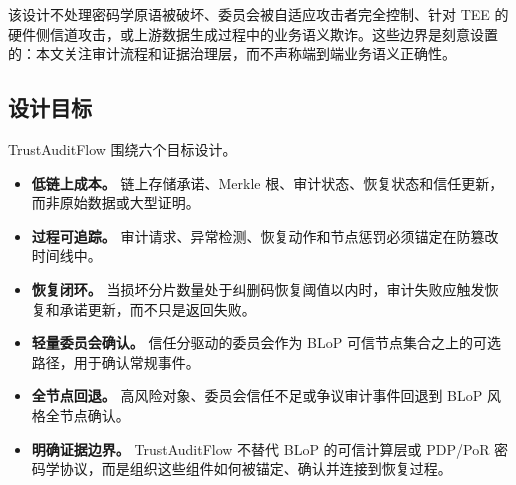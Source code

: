 该设计不处理密码学原语被破坏、委员会被自适应攻击者完全控制、针对 TEE 的硬件侧信道攻击，或上游数据生成过程中的业务语义欺诈。这些边界是刻意设置的：本文关注审计流程和证据治理层，而不声称端到端业务语义正确性。

\subsection{设计目标}

TrustAuditFlow 围绕六个目标设计。

\begin{itemize}
  \item \textbf{低链上成本。} 链上存储承诺、Merkle 根、审计状态、恢复状态和信任更新，而非原始数据或大型证明。
  \item \textbf{过程可追踪。} 审计请求、异常检测、恢复动作和节点惩罚必须锚定在防篡改时间线中。
  \item \textbf{恢复闭环。} 当损坏分片数量处于纠删码恢复阈值以内时，审计失败应触发恢复和承诺更新，而不只是返回失败。
  \item \textbf{轻量委员会确认。} 信任分驱动的委员会作为 BLoP 可信节点集合之上的可选路径，用于确认常规事件。
  \item \textbf{全节点回退。} 高风险对象、委员会信任不足或争议审计事件回退到 BLoP 风格全节点确认。
  \item \textbf{明确证据边界。} TrustAuditFlow 不替代 BLoP 的可信计算层或 PDP/PoR 密码学协议，而是组织这些组件如何被锚定、确认并连接到恢复过程。
\end{itemize}

